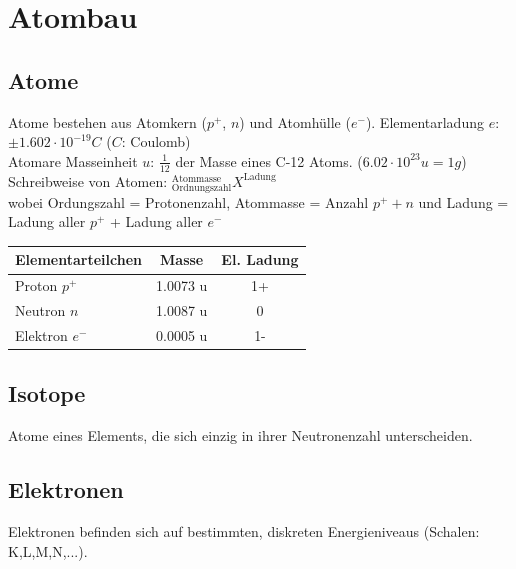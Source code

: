 \section{Atombau}

\subsection{Atome}
Atome bestehen aus Atomkern ($p^+$, $n$) und Atomhülle ($e^-$). 
Elementarladung $e$: $\pm 1.602 \cdot 10^{-19} C$ ($C$: Coulomb) \\
Atomare Masseinheit $u$: $\frac{1}{12}$ der Masse eines C-12 Atoms. ($6.02\cdot10^{23}u=1g$) \\
Schreibweise von Atomen: $ ^\text{Atommasse}_\text{Ordnungszahl} X ^\text{Ladung}$ \\
wobei Ordungszahl = Protonenzahl, Atommasse = Anzahl $p^++n$ und Ladung = Ladung aller $p^+$ + Ladung aller $e^-$

\begin{table}[htbp]
	\begin{tabular}{|l|c|c|}
		Elementarteilchen & Masse & El. Ladung \\ \hline
		Proton $p^+$ & 1.0073 u & 1+ \\
		Neutron $n$ & 1.0087 u & 0 \\
		Elektron $e^-$ & 0.0005 u & 1- \\ \hline
	\end{tabular}
\end{table}

\subsection{Isotope}
Atome eines Elements, die sich einzig in ihrer Neutronenzahl unterscheiden.

\subsection{Elektronen}
Elektronen befinden sich auf bestimmten, diskreten Energieniveaus (Schalen: K,L,M,N,...). 

